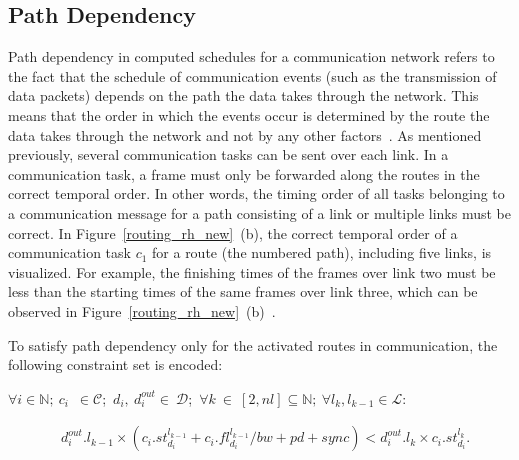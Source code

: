     
      \subsection{Path Dependency}
    
    Path dependency in computed schedules for a communication network refers to the fact that the schedule of communication events (such as the transmission of data packets) depends on the path the data takes through the network. This means that the order in which the events occur is determined by the route the data takes through the network and not by any other factors~\cite{zhang2014task}.
    As mentioned previously, several communication tasks can be sent over each link. In a communication task, a frame must only be forwarded along the routes in the correct temporal order. In other words, the timing order of all tasks belonging to a communication message for a path consisting of a link or multiple links must be correct. In Figure~\ref{routing_rh_new}~(b), the correct temporal order of a communication task $c_1$ for a route (the numbered path), including five links, is visualized. For example, the finishing times of the frames over link two must be less than the starting times of the same frames over link three, which can be observed in Figure~\ref{routing_rh_new}~(b)~\cite{askaripoor2023designer}.
    
    To satisfy path dependency only for the activated routes in communication, the following constraint set is encoded:\newline
 
 
    $\forall i \in \mathbb{N};~{c_i}$~$\in\mathcal{C}$;~$d_i,~d_i^{out}\in~\mathcal{D}$;~$\forall k~\in~[2, nl] \subseteq \mathbb{N};~\forall l_k, l_{k-1}\in\mathcal{L}$:\newline
    
        \begin{equation}
     	\begin{split}
        &d^{out}_{i}.{l_{k-1}} \times (c_i.st_{d_i}^{l_{k-1}} + c_i.fl_{d_i}^{l_{k-1}}/bw + pd + sync) <
        d^{out}_{i}.{l_{k}} \times c_i.st_{d_i}^{l_k}.
     	\label{eqpath13}
     \end{split}
     \end{equation}\newline
       

          
